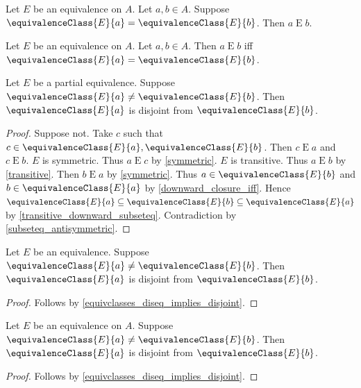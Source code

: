 \begin{proposition}\label{equivclasses_eq_implies_equiv}
    Let $E$ be an equivalence on $A$.
    Let $a, b\in A$.
    Suppose $\equivalenceClass{E}{a} = \equivalenceClass{E}{b}$.
    Then $a\mathrel{E} b$.
\end{proposition}

\begin{proposition}\label{equiv_iff_equivclasses_eq}
    Let $E$ be an equivalence on $A$.
    Let $a, b\in A$.
    Then $a\mathrel{E} b$ iff $\equivalenceClass{E}{a} = \equivalenceClass{E}{b}$.
\end{proposition}

\begin{proposition}\label{equivclasses_diseq_implies_disjoint}
    Let $E$ be a partial equivalence.
    Suppose $\equivalenceClass{E}{a}\neq \equivalenceClass{E}{b}$.
    Then $\equivalenceClass{E}{a}$ is disjoint from $\equivalenceClass{E}{b}$.
\end{proposition}
\begin{proof}
    Suppose not.
    Take $c$ such that $c\in \equivalenceClass{E}{a},\equivalenceClass{E}{b}$.
    Then $c\mathrel{E} a$ and
         $c\mathrel{E} b$.
    $E$ is symmetric.
    Thus $a\mathrel{E} c$ by \cref{symmetric}.
    $E$ is transitive.
    Thus $a\mathrel{E} b$ by \cref{transitive}.
    Then $b\mathrel{E} a$ by \cref{symmetric}.
    Thus $a\in \equivalenceClass{E}{b}$ and $b\in \equivalenceClass{E}{a}$
        by \cref{downward_closure_iff}.
    Hence $\equivalenceClass{E}{a}\subseteq \equivalenceClass{E}{b}\subseteq \equivalenceClass{E}{a}$
        by \cref{transitive_downward_subseteq}.
    Contradiction by \cref{subseteq_antisymmetric}.
\end{proof}

\begin{corollary}\label{equivalence_equivclasses_diseq_implies_disjoint}
    Let $E$ be an equivalence.
    Suppose $\equivalenceClass{E}{a}\neq \equivalenceClass{E}{b}$.
    Then $\equivalenceClass{E}{a}$ is disjoint from $\equivalenceClass{E}{b}$.
\end{corollary}
\begin{proof}
    Follows by \cref{equivclasses_diseq_implies_disjoint}.
\end{proof}

\begin{corollary}\label{equivalenceon_equivclasses_diseq_implies_disjoint}
    Let $E$ be an equivalence on $A$.
    Suppose $\equivalenceClass{E}{a}\neq \equivalenceClass{E}{b}$.
    Then $\equivalenceClass{E}{a}$ is disjoint from $\equivalenceClass{E}{b}$.
\end{corollary}
\begin{proof}
    Follows by \cref{equivclasses_diseq_implies_disjoint}.
\end{proof}


